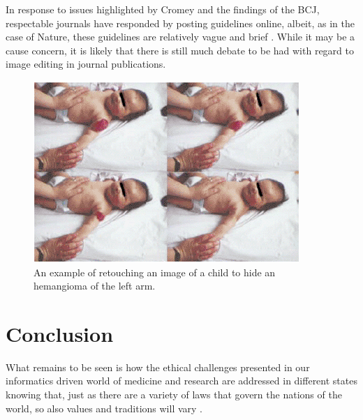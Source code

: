 \documentclass[british,a4paper, 12pt]{article}
\begin{document}
In response to issues highlighted by Cromey and the findings of the BCJ, respectable
journals have responded by posting guidelines online, albeit, as in the case of Nature,
these guidelines are relatively vague and brief \parencite{natureimg}. While it may be a
cause concern, it is likely that there is still much debate to be had with regard to image
editing in journal publications.

\begin{figure}
\label{fig:cutroneimage}
\includegraphics[natheight=\textheight,natwidth=\textwidth]{images/cutrone2001fig.png}
\caption{An example of retouching an image of a child to hide an hemangioma of the left arm.}
\end{figure}

\section{Conclusion}

What remains to be seen is how the ethical challenges presented in our informatics driven
world of medicine and research are addressed in different states knowing that, just as there
are a variety of laws that govern the nations of the world, so also values and traditions will
vary \cite{kluge2000professional}.


\printbibliography
\end{document}
